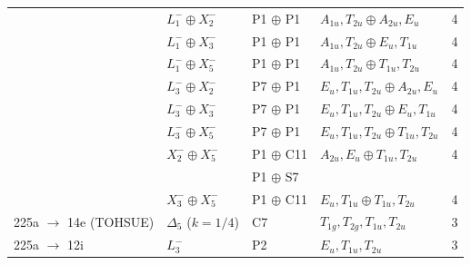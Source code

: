 \documentclass[preprint]{revtex4}
\begin{document}
\begin{table}[!ht]
\begin{tabular}{lllll}
& $L_1^- \oplus X_2^-$ &  P1 $\oplus$ P1 & $A_{1u},T_{2u} \oplus A_{2u},E_u$ & 4 \\

& $L_1^- \oplus X_3^-$ &  P1 $\oplus$ P1 & $A_{1u},T_{2u} \oplus E_u,T_{1u}$ & 4 \\

& $L_1^- \oplus X_5^-$ &  P1 $\oplus$ P1 & $A_{1u},T_{2u} \oplus T_{1u},T_{2u}$ & 4 \\

& $L_3^- \oplus X_2^-$ &  P7 $\oplus$ P1 & $E_u,T_{1u},T_{2u} \oplus A_{2u},E_u$ & 4 \\

& $L_3^- \oplus X_3^-$ &  P7 $\oplus$ P1 & $E_u,T_{1u},T_{2u} \oplus E_u,T_{1u}$ & 4 \\

& $L_3^- \oplus X_5^-$ &  P7 $\oplus$ P1 & $E_u,T_{1u},T_{2u} \oplus T_{1u},T_{2u}$ & 4 \\

& $X_2^- \oplus X_5^-$ &  P1 $\oplus$ C11 & $A_{2u},E_u \oplus T_{1u},T_{2u}$ & 4 \\

& & P1 $\oplus$ S7 & &  \\

& $X_3^- \oplus X_5^-$ &  P1 $\oplus$ C11 & $E_u,T_{1u} \oplus T_{1u},T_{2u}$ & 4 \\

225a $\rightarrow$ 14e (TOHSUE) & $\Delta_5$ ($k=1/4$) & C7 &
$T_{1g},T_{2g},T_{1u},T_{2u}$ & 3 \\

225a $\rightarrow$ 12i & $L_3^-$ & P2 & $E_u,T_{1u},T_{2u}$ & 3 \\
\hline
\end{tabular}
\end{table}

\pagebreak
\end{document}
